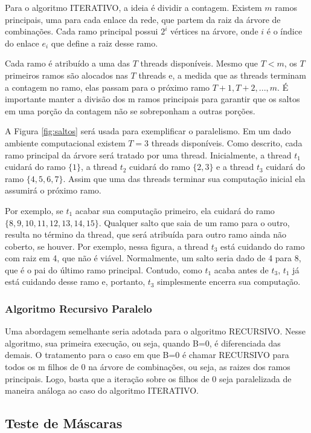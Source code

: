 Para o algoritmo ITERATIVO, a ideia é dividir a contagem. Existem $m$ ramos principais, uma para cada enlace da rede, que partem da raiz da árvore de combinações. Cada ramo principal possui $2^i$ vértices na árvore, onde $i$ é o índice do enlace $e_i$ que define a raiz desse ramo. 

Cada ramo é atribuído a uma das $T$ threads disponíveis. Mesmo que $T < m$, os $T$ primeiros ramos são alocados nas $T$ threads e, a medida que as threads terminam a contagem no ramo, elas passam para o próximo ramo $T+1, T+2, ..., m$. É importante manter a divisão dos m ramos principais para garantir que os saltos em uma porção da contagem não se sobreponham a outras porções.

A Figura \ref{fig:saltos} será usada para exemplificar o paralelismo. Em um dado ambiente computacional existem $T=3$ threads disponíveis. Como descrito, cada ramo principal da árvore será tratado por uma thread. Inicialmente, a thread $t_1$ cuidará do ramo $\{1\}$, a thread $t_2$ cuidará do ramo $\{2, 3\}$ e a thread $t_3$ cuidará do ramo $\{4, 5, 6, 7\}$. Assim que uma das threads terminar sua computação inicial ela assumirá o próximo ramo. 

Por exemplo, se $t_1$ acabar sua computação primeiro, ela cuidará do ramo $\{8,9,10,11,12,13,14,15\}$. Qualquer salto que saia de um ramo para o outro, resulta no término da thread, que será atribuída para outro ramo ainda não coberto, se houver. Por exemplo, nessa figura, a thread $t_3$ está cuidando do ramo com raiz em 4, que não é viável. Normalmente, um salto seria dado de 4 para 8, que é o pai do último ramo principal. Contudo, como $t_1$ acaba antes de $t_3$, $t_1$ já está cuidando desse ramo e, portanto, $t_3$ simplesmente encerra sua computação.  
 
\subsubsection{Algoritmo Recursivo Paralelo}

Uma abordagem semelhante seria adotada para o algoritmo RECURSIVO. Nesse algoritmo, sua primeira execução, ou seja, quando B=0, é diferenciada das demais. O tratamento para o caso em que B=0 é chamar RECURSIVO para todos os m filhos de 0 na árvore de combinações, ou seja, as raizes dos ramos principais. Logo, basta que a iteração sobre os filhos de 0 seja paralelizada de maneira análoga ao caso do algoritmo ITERATIVO. 

\subsection{Teste de Máscaras}


